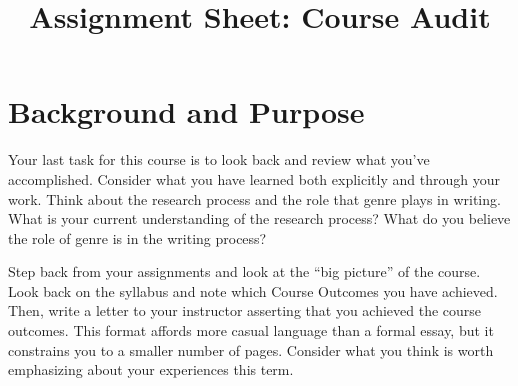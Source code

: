 \documentclass[10pt,twocolumn]{amsart}	%
\title[Course Audit]{Assignment Sheet: Course Audit}
\begin{document}
%
\thispagestyle{empty}
\setlength{\columnsep}{.25in}


\section{Background and Purpose} %
\label{sec:background}
Your last task for this course is to look back and review what you've accomplished. Consider what you have learned both explicitly and through your work. Think about the research process 
and the role that genre plays in writing.
 What is your current understanding of the research process? What do you believe the role of genre is in the writing process?

Step back from your assignments and look at the ``big picture'' of the course. %
Look back on the syllabus and note which Course Outcomes you have achieved. Then, write a letter to your instructor asserting that you achieved the course outcomes. This format affords more casual language than a formal essay, but it constrains you to a smaller number of pages. Consider what you think is worth emphasizing about your experiences this term.%
\end{document}
